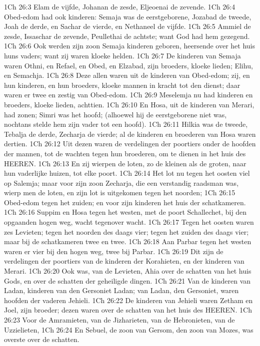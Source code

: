 1Ch 26:3  Elam de vijfde, Johanan de zesde, Eljeoenai de zevende.
1Ch 26:4  Obed-edom had ook kinderen: Semaja was de eerstgeborene, Jozabad de tweede, Joah de derde, en Sachar de vierde, en Nethaneel de vijfde.
1Ch 26:5  Ammiel de zesde, Issaschar de zevende, Peullethai de achtste; want God had hem gezegend.
1Ch 26:6  Ook werden zijn zoon Semaja kinderen geboren, heersende over het huis huns vaders; want zij waren kloeke helden.
1Ch 26:7  De kinderen van Semaja waren Othni, en Refael, en Obed, en Elzabad, zijn broeders, kloeke lieden; Elihu, en Semachja.
1Ch 26:8  Deze allen waren uit de kinderen van Obed-edom; zij, en hun kinderen, en hun broeders, kloeke mannen in kracht tot den dienst; daar waren er twee en zestig van Obed-edom.
1Ch 26:9  Meselemja nu had kinderen en broeders, kloeke lieden, achttien.
1Ch 26:10  En Hosa, uit de kinderen van Merari, had zonen; Simri was het hoofd; (alhoewel hij de eerstgeborene niet was, nochtans stelde hem zijn vader tot een hoofd).
1Ch 26:11  Hilkia was de tweede, Tebalja de derde, Zecharja de vierde; al de kinderen en broederen van Hosa waren dertien.
1Ch 26:12  Uit dezen waren de verdelingen der poortiers onder de hoofden der mannen, tot de wachten tegen hun broederen, om te dienen in het huis des HEEREN.
1Ch 26:13  En zij wierpen de loten, zo de kleinen als de groten, naar hun vaderlijke huizen, tot elke poort.
1Ch 26:14  Het lot nu tegen het oosten viel op Salemja; maar voor zijn zoon Zecharja, die een verstandig raadsman was, wierp men de loten, en zijn lot is uitgekomen tegen het noorden;
1Ch 26:15  Obed-edom tegen het zuiden; en voor zijn kinderen het huis der schatkameren.
1Ch 26:16  Suppim en Hosa tegen het westen, met de poort Schallechet, bij den opgaanden hogen weg, wacht tegenover wacht.
1Ch 26:17  Tegen het oosten waren zes Levieten; tegen het noorden des daags vier; tegen het zuiden des daags vier; maar bij de schatkameren twee en twee.
1Ch 26:18  Aan Parbar tegen het westen waren er vier bij den hogen weg, twee bij Parbar.
1Ch 26:19  Dit zijn de verdelingen der poortiers van de kinderen der Korahieten, en der kinderen van Merari.
1Ch 26:20  Ook was, van de Levieten, Ahia over de schatten van het huis Gods, en over de schatten der geheiligde dingen.
1Ch 26:21  Van de kinderen van Ladan, kinderen van den Gersoniet Ladan; van Ladan, den Gersoniet, waren hoofden der vaderen Jehieli.
1Ch 26:22  De kinderen van Jehieli waren Zetham en Joel, zijn broeder; dezen waren over de schatten van het huis des HEEREN.
1Ch 26:23  Voor de Amramieten, van de Jizharieten, van de Hebronieten, van de Uzzielieten,
1Ch 26:24  En Sebuel, de zoon van Gersom, den zoon van Mozes, was overste over de schatten.
